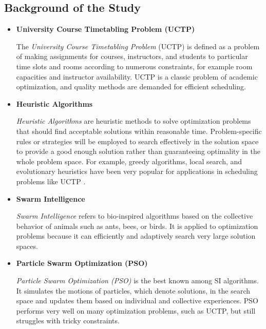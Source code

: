\begin{subs}
    \subsection{Background of the Study}
    \label{subsec:background}
    \begin{itemize}
        \item[] \textbf{University Course Timetabling Problem (UCTP)}
        
        The \textit{University Course Timetabling Problem} (UCTP) is defined as a problem of making assignments for courses, instructors, and students to particular time slots and rooms according to numerous constraints, for example room capacities and instructor availability.\cite{Zhang2014-ak} \cite{Oswald_C2013-zo} \cite{Chen2013-cp} UCTP is a classic problem of academic optimization, and quality methods are demanded for efficient scheduling.\cite{Arratia-Martinez2021-io} \cite{Lih2018-km} \cite{Yang2017-ly} 
    
        \item[] \textbf{Heuristic Algorithms}
    
        \textit{Heuristic Algorithms} are heuristic methods to solve optimization problems that should find acceptable solutions within reasonable time. Problem-specific rules or strategies will be employed to search effectively in the solution space to provide a good enough solution rather than guaranteeing optimality in the whole problem space. For example, greedy algorithms, local search, and evolutionary heuristics have been very popular for applications in scheduling problems like UCTP \cite{Zhang2014-ak} \cite{Lih2018-km}.
    
        \item[] \textbf{Swarm Intelligence}
        
        \textit{Swarm Intelligence} refers to bio-inspired algorithms based on the collective behavior of animals such as ants, bees, or birds. \cite{Gao2024-apso} \cite{Fallahi2022-qpso} It is applied to optimization problems because it can efficiently and adaptively search very large solution spaces. \cite{Oswald_C2013-zo} \cite{Gao2024-apso}
    
        \item[] \textbf{Particle Swarm Optimization (PSO)}
        
        \textit{Particle Swarm Optimization (PSO)} is the best known among SI algorithms. \cite{Liu2017-clqpso} It simulates the motions of particles, which denote solutions, in the search space and updates them based on individual and collective experiences. \cite{Ali2014-mb} \cite{Zhan2009-apso} PSO performs very well on many optimization problems, such as UCTP, but still struggles with tricky constraints. \cite{Chen2013-cp} \cite{Oswald_C2013-zo}
    

\end{itemize}
\end{subs}
